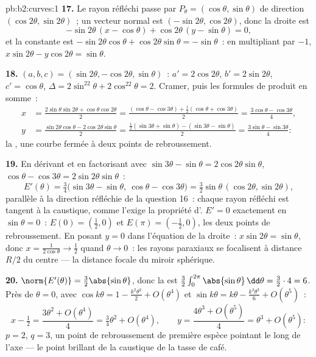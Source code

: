 \begin{solution}{pb:b2:curves:1}
\textbf{17.} Le rayon réfléchi passe par $P_\theta =
(\cos\theta, \sin\theta)$ de direction $(\cos2\theta,
\sin2\theta)$~; un vecteur normal est $(-\sin2\theta,
\cos2\theta)$, donc la droite est
\[
-\sin2\theta\,(x - \cos\theta) + \cos2\theta\,(y -
\sin\theta) = 0,
\]
et la constante est $-\sin2\theta\cos\theta +
\cos2\theta\sin\theta = -\sin\theta$~: en multipliant par $-1$,
$x\sin2\theta - y\cos2\theta = \sin\theta$.

\textbf{18.} $(a, b, c) = (\sin2\theta, -\cos2\theta,
\sin\theta)$~: $a' = 2\cos2\theta$, $b' = 2\sin2\theta$, $c' =
\cos\theta$, $\Delta = 2\sin^22\theta + 2\cos^22\theta = 2$.
Cramer, puis les formules de produit en somme~:
\begin{align*}
x &= \frac{2\sin\theta\sin2\theta +
\cos\theta\cos2\theta}{2}
= \frac{(\cos\theta - \cos3\theta) + \frac12(\cos\theta +
\cos3\theta)}{2} = \frac{3\cos\theta - \cos3\theta}4,\\
y &= \frac{\sin2\theta\cos\theta - 2\cos2\theta\sin\theta}2
= \frac{\frac12(\sin3\theta + \sin\theta) - (\sin3\theta -
\sin\theta)}2 = \frac{3\sin\theta - \sin3\theta}4 :
\end{align*}
la , une courbe fermée à deux points de rebroussement.

\textbf{19.} En dérivant et en factorisant avec $\sin3\theta
- \sin\theta = 2\cos2\theta\sin\theta$, $\cos\theta -
\cos3\theta = 2\sin2\theta\sin\theta$~:
\[
E'(\theta) = \tfrac34\bigl(\sin3\theta - \sin\theta,\
\cos\theta - \cos3\theta\bigr)
= \tfrac32\sin\theta\,(\cos2\theta, \sin2\theta),
\]
parallèle à la direction réfléchie de la question 16~: chaque
rayon réfléchi est tangent à la caustique, comme l'exige la
propriété d'. $E' = 0$ exactement en $\sin\theta = 0$~:
$E(0) = (\tfrac12, 0)$ et $E(\pi) = (-\tfrac12, 0)$, les deux
points de rebroussement. En posant $y = 0$ dans l'équation de la
droite~: $x\sin2\theta =
\sin\theta$, donc $x = \frac1{2\cos\theta} \to \frac12$ quand
$\theta \to 0$~: les rayons paraxiaux se focalisent à distance
$R/2$ du centre --- la distance focale du miroir sphérique.

\textbf{20.} $\norm{E'(\theta)} = \tfrac32\abs{\sin\theta}$,
donc la  est $\tfrac32\int_0^{2\pi}\abs{\sin\theta}\,
\dd\theta = \tfrac32\cdot4 = 6$. Près de $\theta = 0$, avec
$\cos k\theta = 1 - \tfrac{k^2\theta^2}2 + O(\theta^4)$ et
$\sin k\theta = k\theta - \tfrac{k^3\theta^3}6 +
O(\theta^5)$~:
\[
x - \tfrac12 = \frac{3\theta^2 + O(\theta^4)}{4}
= \tfrac34\theta^2 + O(\theta^4),
\qquad
y = \frac{4\theta^3 + O(\theta^5)}{4}
= \theta^3 + O(\theta^5) :
\]
$p = 2$, $q = 3$, un point de rebroussement de première espèce
pointant le long de l'axe --- le point brillant de la caustique de
la tasse de café.


\end{solution}
